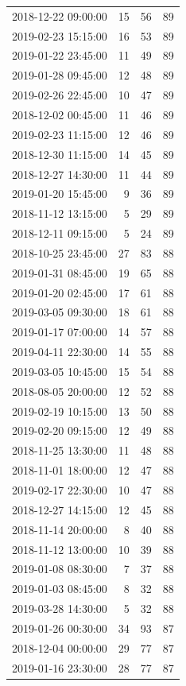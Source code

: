 \begin{tabular}{lrrr}
2018-12-22 09:00:00 & 15 & 56 & 89 \\
2019-02-23 15:15:00 & 16 & 53 & 89 \\
2019-01-22 23:45:00 & 11 & 49 & 89 \\
2019-01-28 09:45:00 & 12 & 48 & 89 \\
2019-02-26 22:45:00 & 10 & 47 & 89 \\
2018-12-02 00:45:00 & 11 & 46 & 89 \\
2019-02-23 11:15:00 & 12 & 46 & 89 \\
2018-12-30 11:15:00 & 14 & 45 & 89 \\
2018-12-27 14:30:00 & 11 & 44 & 89 \\
2019-01-20 15:45:00 & 9 & 36 & 89 \\
2018-11-12 13:15:00 & 5 & 29 & 89 \\
2018-12-11 09:15:00 & 5 & 24 & 89 \\
2018-10-25 23:45:00 & 27 & 83 & 88 \\
2019-01-31 08:45:00 & 19 & 65 & 88 \\
2019-01-20 02:45:00 & 17 & 61 & 88 \\
2019-03-05 09:30:00 & 18 & 61 & 88 \\
2019-01-17 07:00:00 & 14 & 57 & 88 \\
2019-04-11 22:30:00 & 14 & 55 & 88 \\
2019-03-05 10:45:00 & 15 & 54 & 88 \\
2018-08-05 20:00:00 & 12 & 52 & 88 \\
2019-02-19 10:15:00 & 13 & 50 & 88 \\
2019-02-20 09:15:00 & 12 & 49 & 88 \\
2018-11-25 13:30:00 & 11 & 48 & 88 \\
2018-11-01 18:00:00 & 12 & 47 & 88 \\
2019-02-17 22:30:00 & 10 & 47 & 88 \\
2018-12-27 14:15:00 & 12 & 45 & 88 \\
2018-11-14 20:00:00 & 8 & 40 & 88 \\
2018-11-12 13:00:00 & 10 & 39 & 88 \\
2019-01-08 08:30:00 & 7 & 37 & 88 \\
2019-01-03 08:45:00 & 8 & 32 & 88 \\
2019-03-28 14:30:00 & 5 & 32 & 88 \\
2019-01-26 00:30:00 & 34 & 93 & 87 \\
2018-12-04 00:00:00 & 29 & 77 & 87 \\
2019-01-16 23:30:00 & 28 & 77 & 87 \\

\end{tabular}

